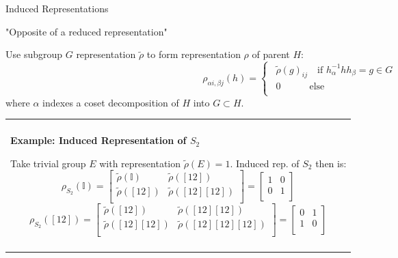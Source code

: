 \documentclass[11pt]{beamer}
\newenvironment{boxed2}
    {\begin{center}
    \begin{tabular}{|p{0.95\textwidth}|}
    \hline\\
    }
    { 
    \\\\\hline
    \end{tabular} 
    \end{center}
    }
\begin{document}
\begin{frame}{Induced Representations}
	\begin{center}
	"Opposite of a reduced representation"
	\end{center}

\vspace{0.15cm}

Use subgroup $G$ representation $\tilde{\rho}$ to form representation $\rho$ of parent $H$:
$$
\rho_{\alpha i ,\beta j}(h) = \begin{cases}
\ \ \tilde{\rho}(g)_{ij}	\quad\text{if } h_{\alpha}^{-1}h h_{\beta}=g\in G \\ 
\ \ 0 \quad \quad \quad  \text{else} \\
\end{cases}
$$
where $\alpha$ indexes a coset decomposition of $H$  into $G\subset H$.


\begin{boxed2}
	
	\vspace{-.61cm}
	\footnotesize
	\textbf{Example: Induced Representation of $S_2$} 
	
	Take trivial group $E$ with representation $\tilde{\rho}(E)=1$. Induced rep. of $S_2$ then is:
$$
		\rho_{S_2}(\mathbb{I})=\begin{bmatrix}
			\tilde{\rho}(\mathbb{I}) &\tilde{\rho}([12]) \\
			 \tilde{\rho}([12])&\tilde{\rho}([12][12]) \\
		\end{bmatrix}
		=\begin{bmatrix}
			1 & 0 \\
			0 & 1 \\
		\end{bmatrix}
$$
$$
	\rho_{S_2}([12]) =\begin{bmatrix}
		\tilde{\rho}([12]) &\tilde{\rho}([12][12]) \\
		\tilde{\rho}([12][12])&\tilde{\rho}([12][12][12]) \\
	\end{bmatrix}
	=\begin{bmatrix}
		0 & 1 \\
		1 & 0 \\
	\end{bmatrix}
$$
	

	\vspace{-.3cm}
	
\end{boxed2}	

\end{frame}
\end{document}
